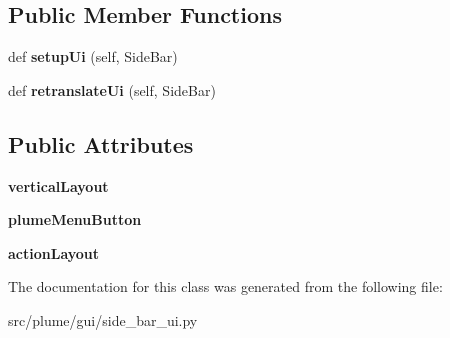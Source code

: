 \subsection*{Public Member Functions}
\begin{DoxyCompactItemize}
\item 
def {\bfseries setup\+Ui} (self, Side\+Bar)\hypertarget{classplume-creator_1_1src_1_1plume_1_1gui_1_1side__bar__ui_1_1_ui___side_bar_ab44db0d76b3c3e5eb106f85b0390d3b0}{}\label{classplume-creator_1_1src_1_1plume_1_1gui_1_1side__bar__ui_1_1_ui___side_bar_ab44db0d76b3c3e5eb106f85b0390d3b0}

\item 
def {\bfseries retranslate\+Ui} (self, Side\+Bar)\hypertarget{classplume-creator_1_1src_1_1plume_1_1gui_1_1side__bar__ui_1_1_ui___side_bar_a1d24625b25715d1a380cd129e44dbc69}{}\label{classplume-creator_1_1src_1_1plume_1_1gui_1_1side__bar__ui_1_1_ui___side_bar_a1d24625b25715d1a380cd129e44dbc69}

\end{DoxyCompactItemize}
\subsection*{Public Attributes}
\begin{DoxyCompactItemize}
\item 
{\bfseries vertical\+Layout}\hypertarget{classplume-creator_1_1src_1_1plume_1_1gui_1_1side__bar__ui_1_1_ui___side_bar_acb158f8e3033998f989e5c3e5bfba029}{}\label{classplume-creator_1_1src_1_1plume_1_1gui_1_1side__bar__ui_1_1_ui___side_bar_acb158f8e3033998f989e5c3e5bfba029}

\item 
{\bfseries plume\+Menu\+Button}\hypertarget{classplume-creator_1_1src_1_1plume_1_1gui_1_1side__bar__ui_1_1_ui___side_bar_a9da4f42476905a9af058e4aaeeec3687}{}\label{classplume-creator_1_1src_1_1plume_1_1gui_1_1side__bar__ui_1_1_ui___side_bar_a9da4f42476905a9af058e4aaeeec3687}

\item 
{\bfseries action\+Layout}\hypertarget{classplume-creator_1_1src_1_1plume_1_1gui_1_1side__bar__ui_1_1_ui___side_bar_a7c19681f0b31e763391eb717d70c0cbc}{}\label{classplume-creator_1_1src_1_1plume_1_1gui_1_1side__bar__ui_1_1_ui___side_bar_a7c19681f0b31e763391eb717d70c0cbc}

\end{DoxyCompactItemize}


The documentation for this class was generated from the following file\+:\begin{DoxyCompactItemize}
\item 
src/plume/gui/side\+\_\+bar\+\_\+ui.\+py\end{DoxyCompactItemize}
